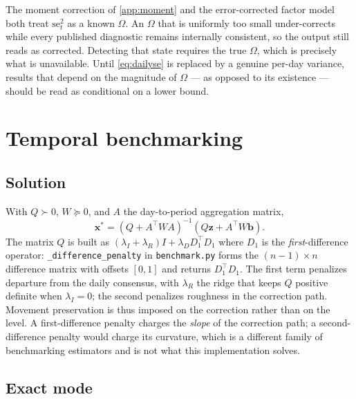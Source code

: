 \documentclass[12pt,a4paper,oneside]{article}
\begin{document}
\begin{remark}
The moment correction of \cref{app:moment} and the error-corrected factor model
both treat $\mathrm{se}_t^2$ as a known $\Omega$. An $\Omega$ that is uniformly
too small under-corrects while every published diagnostic remains internally
consistent, so the output still reads as corrected. Detecting that state requires
the true $\Omega$, which is precisely what is unavailable. Until
\eqref{eq:dailyse} is replaced by a genuine per-day variance, results that depend
on the magnitude of $\Omega$ --- as opposed to its existence --- should be read as
conditional on a lower bound.
\end{remark}

\section{Temporal benchmarking}

\subsection{Solution}

With $Q\succ 0$, $W\succeq 0$, and $A$ the day-to-period aggregation matrix,
\begin{equation}
\bm{x}^*=(Q+A^\top WA)^{-1}(Q\bm{z}+A^\top W\bm{b}).
\end{equation}
The matrix $Q$ is built as $(\lambda_I+\lambda_R)I+\lambda_D D_1^\top D_1$ where
$D_1$ is the \emph{first}-difference operator: \texttt{\_difference\_penalty} in
\texttt{benchmark.py} forms the $(n-1)\times n$ difference matrix with offsets
$[0,1]$ and returns $D_1^\top D_1$. The first term penalizes departure from the
daily consensus, with $\lambda_R$ the ridge that keeps $Q$ positive definite when
$\lambda_I=0$; the second penalizes roughness in the correction path. Movement
preservation is thus imposed on the correction rather than on the level. A
first-difference penalty charges the \emph{slope} of the correction path; a
second-difference penalty would charge its curvature, which is a different
family of benchmarking estimators and is not what this implementation solves.

\subsection{Exact mode}
\end{document}
